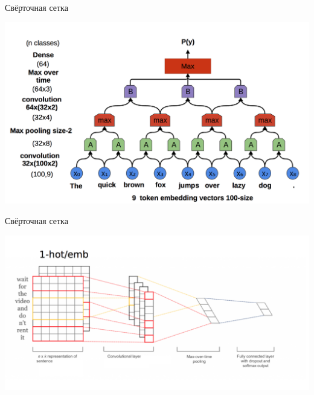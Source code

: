\documentclass[notes,12pt, aspectratio=169]{beamer}
\newenvironment{transitionframe}{
  \setbeamercolor{background canvas}{bg=yellow}
  \begin{frame}}{
    \end{frame}
}
\begin{document}
\begin{frame}{Свёрточная сетка}
\begin{center}
	\includegraphics[width=.75\linewidth]{conv5.png}
\end{center}
\end{frame} 


\begin{frame}{Свёрточная сетка}
\begin{center}
	\includegraphics[width=.75\linewidth]{conv6.png}
\end{center}
\end{frame} 




%
\end{document}
